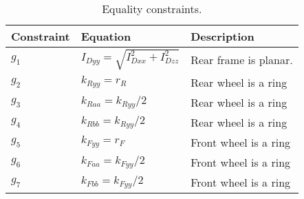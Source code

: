 \documentclass{bmd2019p}
\begin{document}
%
\begin{table}
  \caption{Equality constraints.}
  \label{tab:equality-constraints}
  \centering
  \begin{tabular}{lll}
    \toprule
    Constraint & Equation & Description \\
    \midrule
    $g_1$ & $I_{Dyy} = \sqrt{I_{Dxx}^2 + I_{Dzz}^2}$ & Rear frame is planar. \\
    $g_2$ & $k_{Ryy} = r_R$  & Rear wheel is a ring \\
    $g_3$ & $k_{Raa} = k_{Ryy}/2$ & Rear wheel is a ring \\
    $g_4$ & $k_{Rbb} = k_{Ryy}/2$ & Rear wheel is a ring \\
    $g_5$ & $k_{Fyy} = r_F$  & Front wheel is a ring \\
    $g_6$ & $k_{Faa} = k_{Fyy}/2$ & Front wheel is a ring \\
    $g_7$ & $k_{Fbb} = k_{Fyy}/2$ & Front wheel is a ring \\
    \bottomrule
  \end{tabular}
\end{table}
%
\end{document}
